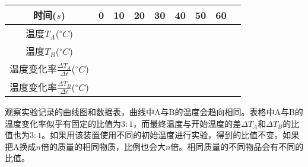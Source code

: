 \begin{tabular}{c|c|c|c|c|c|c|c|c}
\hline
时间($s$) & 0 & 10 & 20 & 30 & 40 & 50 & 60 \\ \hline
温度$T_A$($^\circ C$) & & & & & & & \\ \hline
温度$T_B$($^\circ C$) & & & & & & & \\ \hline
温度变化率$\frac{\Delta T_A}{\Delta t}$($^\circ C$) & & & & & & & \\ \hline
温度变化率$\frac{\Delta T_B}{\Delta t}$($^\circ C$) & & & & & & & \\ \hline
\end{tabular}

观察实验记录的曲线图和数据表，曲线中A与B的温度会趋向相同。表格中A与B的温度变化率似乎有固定的比值为$3:1$，而最终温度与开始温度的差$\Delta T_A$和$\Delta T_B$的比值也为$3:1$。如果用该装置使用不同的初始温度进行实验，得到的比值不变。如果把A换成$n$倍的质量的相同物质，比例也会大$n$倍。相同质量的不同物品会有不同的比值。
